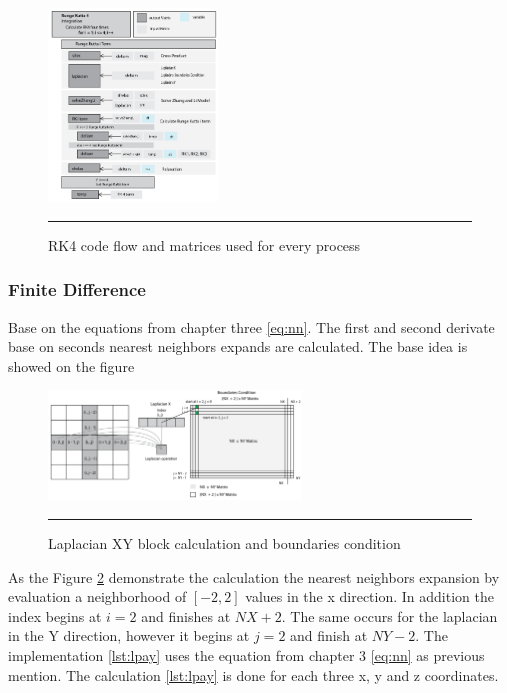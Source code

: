 \begin{figure}[htbp]
	\centering
		\includegraphics[width=0.4\textwidth]{Figures/rk4flow.png}
		\rule{35em}{0.2pt}
	\caption[Runge and Kutta Integration Code Flow]{RK4 code flow and matrices used for every process}
	\label{fig:sim}
\end{figure}


\subsubsection{Finite Difference }

Base on the equations from chapter three \ref{eq:nn}. The first and second derivate base on seconds nearest neighbors expands are calculated. The base idea is showed on the figure	 \label{fig:laplacian}

\begin{figure}[htbp]
	\centering
		\includegraphics[width=0.6\textwidth]{Figures/laplacian.png}
		\rule{35em}{0.2pt}
	\caption[Laplacian block calculation]{Laplacian XY block calculation and boundaries condition}
	\label{fig:laplacian}
\end{figure}

As the Figure \ref{fig:laplacian} demonstrate the calculation the nearest neighbors expansion by evaluation a neighborhood of $[-2, 2]$ values in the x direction. In addition the index begins at $i = 2$ and finishes at $NX + 2$. The same occurs for the laplacian in the Y direction, however it begins at $j = 2$ and finish at $NY -2$.  The implementation \ref{lst:lpay} uses the equation from chapter 3 \ref{eq:nn} as previous mention. The calculation \ref{lst:lpay} is done for each three x, y and z coordinates. 

